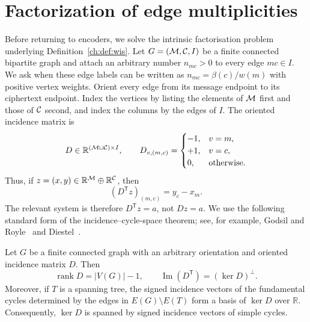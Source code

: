 \section{Factorization of edge multiplicities}\label{ch:subsec:cycle-factorisation}
Before returning to encoders, we solve the intrinsic factorisation
problem underlying Definition~\ref{ch:def:wis}.  Let $G=(\mathcal{M},\mathcal{C},I)$
be a finite connected bipartite graph and attach an arbitrary number
$n_{mc}>0$ to every edge $mc\in I$.  We ask when these edge labels can
be written as $n_{mc}=\beta(c)/w(m)$ with positive vertex weights.
Orient every edge from its message endpoint to its ciphertext endpoint.
Index the vertices by listing the elements of $\mathcal{M}$ first and those of
$\mathcal{C}$ second, and index the columns by the edges of $I$.  The oriented
incidence matrix is
\[
 D\in\mathbb R^{(\mathcal{M}\sqcup\mathcal{C})\times I},\qquad
 D_{v,(m,c)}=
 \begin{cases}
 -1,&v=m,\\
 +1,&v=c,\\
 0,&\text{otherwise}.
 \end{cases}
\]
Thus, if $z=(x,y)\in\mathbb R^{\mathcal{M}}\oplus\mathbb R^{\mathcal{C}}$, then
\begin{equation}\label{ch:eq:incidence-transpose}
 (D^{\mathsf T}z)_{(m,c)}=y_c-x_m.
\end{equation}
The relevant system is therefore $D^{\mathsf T}z=a$, not $Dz=a$.
We use the following standard form of the incidence--cycle-space
theorem; see, for example, Godsil and Royle~\cite[Sec.~8.2]{godsil2001algebraic}
and Diestel~\cite[Sec.~1.9]{diestel2017}.
\begin{lemma}\label{ch:lem:incidence-cycle-space}
Let $G$ be a finite connected graph with an arbitrary orientation and
oriented incidence matrix $D$.  Then
\[
 \operatorname{rank}D=|V(G)|-1,
 \qquad
 \operatorname{Im}(D^{\mathsf T})=(\ker D)^\perp.
\]
Moreover, if $T$ is a spanning tree, the signed incidence vectors of
the fundamental cycles determined by the edges in $E(G)\setminus E(T)$
form a basis of $\ker D$ over $\mathbb R$.  Consequently, $\ker D$ is
spanned by signed incidence vectors of simple cycles.
\end{lemma}
